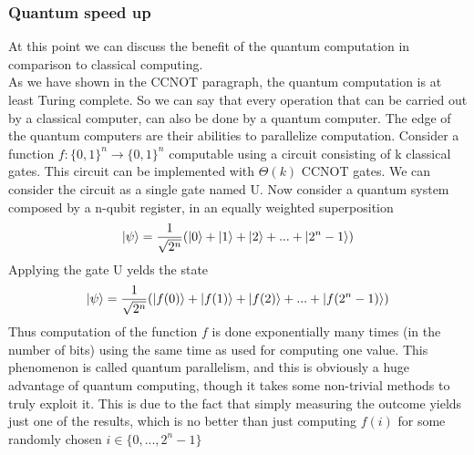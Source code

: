 \documentclass[main.tex]{subfiles}
\theoremstyle{definition}
\begin{document}
	\subsubsection{Quantum speed up} At this point we can discuss the benefit of the quantum 
	computation in comparison to classical computing. \\
	As we have shown in the CCNOT paragraph, the quantum computation is at least Turing complete. So
	we can say that every operation that can be carried out by a classical computer, can also be done by 
	a quantum computer. The edge of the quantum computers are their abilities to parallelize 
	computation. Consider a function $f: \{0, 1\}^n\rightarrow\{0, 1\}^n$ computable using a circuit 
	consisting of k classical gates.
	This circuit can be implemented with $\Theta(k)$ CCNOT gates. We can consider the circuit as a 
	single gate named U. Now consider a quantum system composed by a n-qubit register, in an equally 
	weighted superposition
	\begin{equation}
	\ket{\psi}=\frac{1}{\sqrt{2^{n}}}(\ket{0}+\ket{1}+\ket{2}+...+\ket{2^{n}-1})
	\end{equation}
	Applying the gate U yelds the state
	\begin{equation}
	\ket{\psi}=\frac{1}{\sqrt{2^{n}}}(\ket{f(0)}+\ket{f(1)}+\ket{f(2)}+...+\ket{f(2^{n}-1)})
	\end{equation}
	Thus computation of the function $f$ is done exponentially many times (in the number
of bits) using the same time as used for computing one value. This phenomenon
is called quantum parallelism, and this is obviously a huge advantage of quantum
computing, though it takes some non-trivial methods to truly exploit it. This is due
to the fact that simply measuring the outcome yields just one of the results, which
is no better than just computing $f(i)$ for some randomly chosen $i\in\{0,...,2^{n}-1\}$
\end{document}
